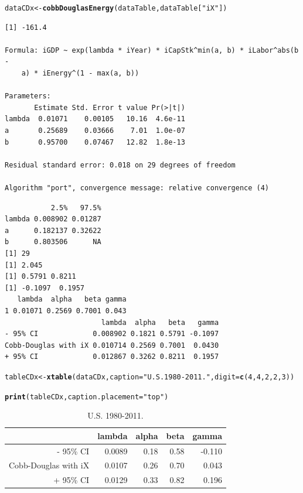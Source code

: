 \documentclass[preprint,authoryear,12pt]{elsarticle}\usepackage{graphicx, color}
\makeatletter
\newcommand{\hlfunctioncall}[1]{\textcolor[rgb]{0.501960784313725,0,0.329411764705882}{\textbf{#1}}}%
\newcommand{\hlstring}[1]{\textcolor[rgb]{0.6,0.6,1}{#1}}%
\newenvironment{kframe}{%
 \def\at@end@of@kframe{}%
 \ifinner\ifhmode%
  \def\at@end@of@kframe{\end{minipage}}%
  \begin{minipage}{\columnwidth}%
 \fi\fi%
 \def\FrameCommand##1{\hskip\@totalleftmargin \hskip-\fboxsep
 \colorbox{shadecolor}{##1}\hskip-\fboxsep
     \hskip-\linewidth \hskip-\@totalleftmargin \hskip\columnwidth}%
 \MakeFramed {\advance\hsize-\width
   \@totalleftmargin\z@ \linewidth\hsize
   \@setminipage}}%
 {\par\unskip\endMakeFramed%
 \at@end@of@kframe}
\newenvironment{knitrout}{}{} %
\makeatother
\begin{document}
\begin{knitrout}
\color{fgcolor}\begin{kframe}
\begin{alltt}
dataCDx <- \hlfunctioncall{cobbDouglasEnergy}(dataTable, dataTable[\hlstring{"iX"}])
\end{alltt}
\begin{verbatim}
[1] -161.4

Formula: iGDP ~ exp(lambda * iYear) * iCapStk^min(a, b) * iLabor^abs(b - 
    a) * iEnergy^(1 - max(a, b))

Parameters:
       Estimate Std. Error t value Pr(>|t|)
lambda  0.01071    0.00105   10.16  4.6e-11
a       0.25689    0.03666    7.01  1.0e-07
b       0.95700    0.07467   12.82  1.8e-13

Residual standard error: 0.018 on 29 degrees of freedom

Algorithm "port", convergence message: relative convergence (4) 
\end{verbatim}


{\ttfamily\noindent\itshape\color{messagecolor}{Waiting for profiling to be done...}}\begin{verbatim}
           2.5%   97.5%
lambda 0.008902 0.01287
a      0.182137 0.32622
b      0.803506      NA
[1] 29
[1] 2.045
[1] 0.5791 0.8211
[1] -0.1097  0.1957
   lambda  alpha   beta gamma
1 0.01071 0.2569 0.7001 0.043
                       lambda  alpha   beta   gamma
- 95% CI             0.008902 0.1821 0.5791 -0.1097
Cobb-Douglas with iX 0.010714 0.2569 0.7001  0.0430
+ 95% CI             0.012867 0.3262 0.8211  0.1957
\end{verbatim}
\begin{alltt}
tableCDx <- \hlfunctioncall{xtable}(dataCDx, caption=\hlstring{"U.S. 1980-2011."}, digit = \hlfunctioncall{c}(4, 4, 2, 2, 3))
\end{alltt}
\end{kframe}
\end{knitrout}


\begin{kframe}
\begin{alltt}
\hlfunctioncall{print}(tableCDx, caption.placement=\hlstring{"top"})
\end{alltt}
\end{kframe}%
\begin{table}[ht]
\begin{center}
\caption{U.S. 1980-2011.}
\begin{tabular}{rrrrr}
  \hline
 & lambda & alpha & beta & gamma \\ 
  \hline
- 95\% CI & 0.0089 & 0.18 & 0.58 & -0.110 \\ 
  Cobb-Douglas with iX & 0.0107 & 0.26 & 0.70 & 0.043 \\ 
  + 95\% CI & 0.0129 & 0.33 & 0.82 & 0.196 \\ 
   \hline
\end{tabular}
\end{center}
\end{table}
\end{document}
